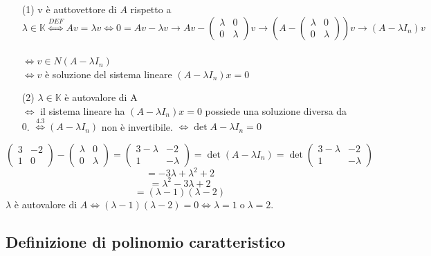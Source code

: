 \documentclass[12pt]{article}
\begin{document}
\begin{enumerate}
    \item[(1)] v è auttovettore di $A$ rispetto a $\lambda \in \mathbb{K} \stackrel{DEF}{\Longleftrightarrow} Av = \lambda v \Longleftrightarrow 0 = Av - \lambda v \rightarrow Av - \begin{pmatrix}
        \lambda & 0\\
        0 & \lambda
    \end{pmatrix}v \rightarrow \left(A - \begin{pmatrix}
        \lambda & 0\\
        0 & \lambda
    \end{pmatrix}\right)v \rightarrow (A - \lambda I_n)v$
    \\\\
    $\Longleftrightarrow v \in N(A - \lambda I_n)$\\
    $\Longleftrightarrow v$ è soluzione del sistema lineare $(A - \lambda I_n)x = 0$
    \item[(2)] $\lambda \in \mathbb{K}$ è autovalore di A\\
    $\Longleftrightarrow$ il sistema lineare ha $(A - \lambda I_n)x = 0$ possiede una soluzione diversa da $0$.
    $\stackrel{4.3}{\Longleftrightarrow} (A - \lambda I_n)$ non è invertibile.
    $\Longleftrightarrow \det{A - \lambda I_n} = 0$
\end{enumerate}
    \[\begin{pmatrix}
        3 & -2\\
        1 & 0
    \end{pmatrix} - \begin{pmatrix}
        \lambda  & 0 \\
        0 & \lambda
    \end{pmatrix} = \begin{pmatrix}
        3 - \lambda & -2\\
        1 & - \lambda
    \end{pmatrix} = \det{(A - \lambda I_n)} = \det{\begin{pmatrix}
        3 - \lambda & -2\\
        1 & - \lambda
    \end{pmatrix}}\] \[= -3\lambda + \lambda^2 + 2\]
    \[= \lambda^2 - 3\lambda + 2\]
    \[= (\lambda - 1)(\lambda - 2)\]
$\lambda$ è autovalore di $A \Longleftrightarrow (\lambda - 1)(\lambda - 2) = 0 \Longleftrightarrow \lambda = 1 \; \text{o} \; \lambda = 2$.

\subsection{Definizione di polinomio caratteristico}
\end{document}
